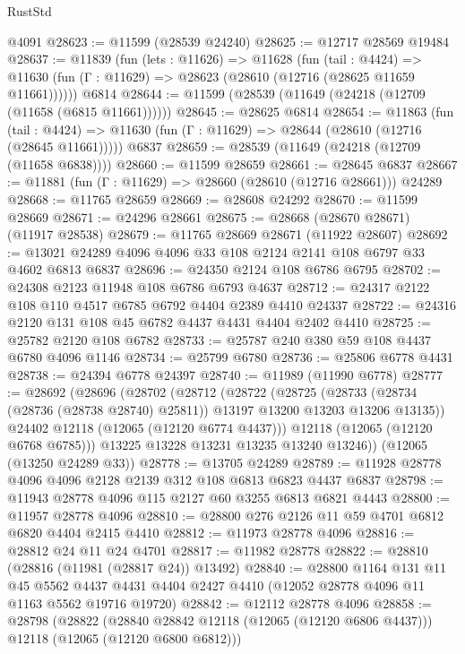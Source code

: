 \begin{lexlean}{RustStd}
\begin{coremodule}
    @4091
@28623 := @11599 (@28539 @24240)
@28625 := @12717 @28569 @19484
@28637 := @11839
    (fun (lets : @11626) =>
    @11628
      (fun (tail : @4424) =>
      @11630 (fun (Γ : @11629) => @28623 (@28610 (@12716 (@28625 @11659 @11661))))))
    @6814
@28644 := @11599 (@28539 (@11649 (@24218 (@12709 (@11658 (@6815 @11661))))))
@28645 := @28625 @6814
@28654 := @11863
    (fun (tail : @4424) => @11630 (fun (Γ : @11629) => @28644 (@28610 (@12716 (@28645 @11661)))))
    @6837
@28659 := @28539 (@11649 (@24218 (@12709 (@11658 @6838))))
@28660 := @11599 @28659
@28661 := @28645 @6837
@28667 := @11881 (fun (Γ : @11629) => @28660 (@28610 (@12716 @28661))) @24289
@28668 := @11765 @28659
@28669 := @28608 @24292
@28670 := @11599 @28669
@28671 := @24296 @28661
@28675 := @28668 (@28670 @28671) (@11917 @28538)
@28679 := @11765 @28669 @28671 (@11922 @28607)
@28692 := @13021 @24289 @4096 @4096 @33 @108 @2124 @2141 @108 @6797 @33 @4602 @6813 @6837
@28696 := @24350 @2124 @108 @6786 @6795
@28702 := @24308 @2123 @11948 @108 @6786 @6793 @4637
@28712 := @24317 @2122 @108 @110 @4517 @6785 @6792 @4404 @2389 @4410 @24337
@28722 := @24316 @2120 @131 @108 @45 @6782 @4437 @4431 @4404 @2402 @4410
@28725 := @25782 @2120 @108 @6782
@28733 := @25787 @240 @380 @59 @108 @4437 @6780 @4096 @1146
@28734 := @25799 @6780
@28736 := @25806 @6778 @4431
@28738 := @24394 @6778 @24397
@28740 := @11989 (@11990 @6778)
@28777 := @28692
    (@28696
      (@28702
        (@28712
          (@28722
            (@28725
              (@28733 (@28734 (@28736 (@28738 @28740) @25811)) @13197 @13200 @13203 @13206 @13135))
            @24402
            @12118
            (@12065 (@12120 @6774 @4437)))
          @12118
          (@12065 (@12120 @6768 @6785)))
        @13225
        @13228
        @13231
        @13235
        @13240
        @13246))
    (@12065 (@13250 @24289 @33))
@28778 := @13705 @24289
@28789 := @11928 @28778 @4096 @4096 @2128 @2139 @312 @108 @6813 @6823 @4437 @6837
@28798 := @11943 @28778 @4096 @115 @2127 @60 @3255 @6813 @6821 @4443
@28800 := @11957 @28778 @4096
@28810 := @28800 @276 @2126 @11 @59 @4701 @6812 @6820 @4404 @2415 @4410
@28812 := @11973 @28778 @4096
@28816 := @28812 @24 @11 @24 @4701
@28817 := @11982 @28778
@28822 := @28810 (@28816 (@11981 (@28817 @24)) @13492)
@28840 := @28800
    @1164
    @131
    @11
    @45
    @5562
    @4437
    @4431
    @4404
    @2427
    @4410
    (@12052 @28778 @4096 @11 @1163 @5562 @19716 @19720)
@28842 := @12112 @28778 @4096
@28858 := @28798
    (@28822
      (@28840 @28842 @12118 (@12065 (@12120 @6806 @4437)))
      @12118
      (@12065 (@12120 @6800 @6812)))

\end{coremodule}
\end{lexlean}
